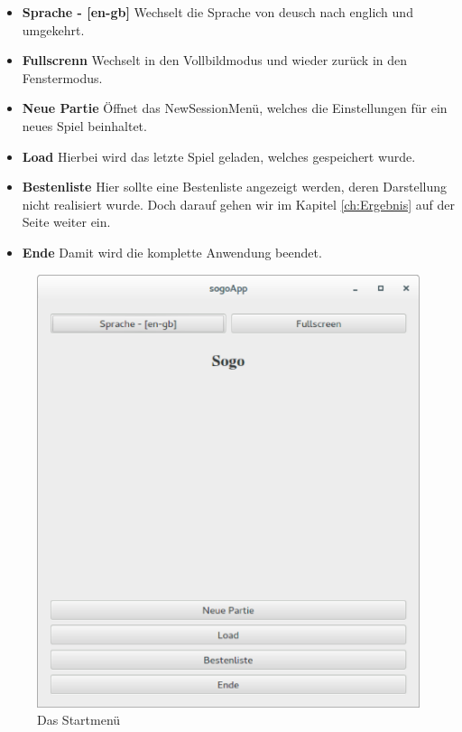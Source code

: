 \documentclass[a4paper]{scrartcl}
\begin{document}
\begin{itemize}
	\item \textbf{Sprache - [en-gb]} Wechselt die Sprache von deusch nach englich und umgekehrt.
	\item \textbf{Fullscrenn} Wechselt in den Vollbildmodus und wieder zurück in den Fenstermodus.
	\item \textbf{Neue Partie} Öffnet das NewSessionMenü, welches die Einstellungen für ein neues Spiel beinhaltet.
	\item \textbf{Load} Hierbei wird das letzte Spiel geladen, welches gespeichert wurde.
	\item \textbf{Bestenliste} Hier sollte eine Bestenliste angezeigt werden, deren Darstellung nicht realisiert wurde. Doch darauf gehen wir im Kapitel \ref{ch:Ergebnis} auf der Seite \pageref{ch:Ergebnis} weiter ein.
	\item \textbf{Ende} Damit wird die komplette Anwendung beendet.
\end{itemize}

\begin{figure}[H]
 \centering
 \includegraphics[scale=0.35]{graphics/startmenu.eps}
 \caption{Das Startmenü}
 \label{fig:Startmenü}
\end{figure}
\end{document}
